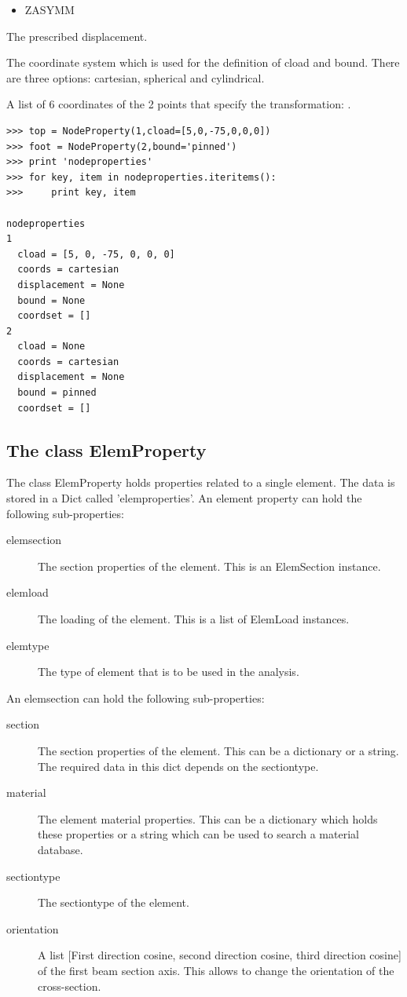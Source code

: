 {\begin{description}
\begin{itemize}
\begin{itemize}
         \item ZASYMM
         \end{itemize} 
     \end{itemize}
 \item [displacement] The prescribed displacement. 
 \item [coords] The coordinate system which is used for the definition of cload and bound. There are three options:
         cartesian, spherical and cylindrical.
 \item [coordset] A list of 6 coordinates of the 2 points that specify the transformation: \Code{[x_1, y_1, z_1, x_2, y_2, z_2]}.
\end{description}

\begin{verbatim}
>>> top = NodeProperty(1,cload=[5,0,-75,0,0,0])
>>> foot = NodeProperty(2,bound='pinned')
>>> print 'nodeproperties'    
>>> for key, item in nodeproperties.iteritems():
>>>     print key, item

nodeproperties
1
  cload = [5, 0, -75, 0, 0, 0]
  coords = cartesian
  displacement = None
  bound = None
  coordset = []
2
  cload = None
  coords = cartesian
  displacement = None
  bound = pinned
  coordset = []
\end{verbatim}

\subsection{The class ElemProperty}
The class ElemProperty holds properties related to a single element. The data is stored in a Dict called 'elemproperties'. An element property can hold the following sub-properties:
\begin{description}
\item [elemsection] The section properties of the element. This is an ElemSection instance.
\item [elemload] The loading of the element. This is a list of ElemLoad instances.
\item [elemtype] The type of element that is to be used in the analysis. 
\end{description}

An elemsection can hold the following sub-properties:
\begin{description}
\item [section] The section properties of the element. This can be a dictionary or a string. The required data in this dict depends on the sectiontype. 
\item [material] The element material properties. This can be a dictionary which holds these properties or a string which can be used to search a material database. 
\item [sectiontype] The sectiontype of the element. 
\item [orientation]  A list [First direction cosine, second direction cosine, third direction cosine] of the first beam section axis. This allows to change the orientation of the cross-section.
\end{description}

}
